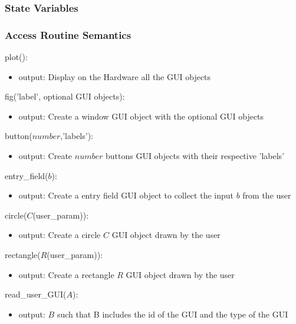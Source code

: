 \documentclass[12pt, titlepage]{article}
\begin{document}
\subsubsection{State Variables}


\subsubsection{Access Routine Semantics}

\noindent plot():
\begin{itemize}
\item output: Display on the Hardware all the GUI objects 
\end{itemize}

\noindent fig('label', optional GUI objects):
\begin{itemize}
\item output: Create a window GUI object with the optional GUI objects
\end{itemize}

\noindent button($number$,'labels'):
\begin{itemize}
\item output: Create $number$ buttons GUI objects with their respective 'labels'
\end{itemize}

\noindent entry{\_}field($b$):
\begin{itemize}
\item output: Create a entry field GUI object to collect the input $b$ from the user
\end{itemize}

\noindent circle($C$(user{\_}param)):
\begin{itemize}
\item output: Create a circle $C$ GUI object drawn by the user 
\end{itemize}

\noindent rectangle($R$(user{\_}param)):
\begin{itemize}
\item output: Create a rectangle $R$ GUI object drawn by the user 
\end{itemize}
\newpage

\noindent read{\_}user{\_}GUI($A$):
\begin{itemize}
\item output:  $B$ such that B includes the id of the GUI and the type of the GUI
\end{itemize}
\bigskip



\end{document}
